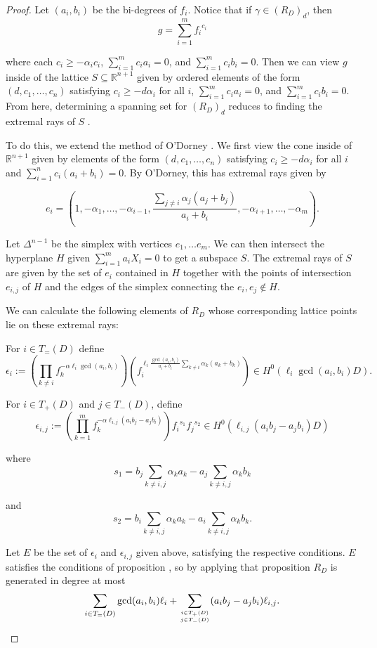 \documentclass{amsart}
\theoremstyle{plain}
\theoremstyle{definition}
\theoremstyle{remark}
\numberwithin{equation}{section}
\newcommand\bida{a}
\newcommand\bidb{b}
\begin{document}
\begin{proof}
Let $(\bida_i, \bidb_i)$ be the bi-degrees of $f_i$. Notice that if $\gamma
\in (R_D)_d$, then 
\[
	g = \sum_{i=1}^m {f_i}^{c_i}
\]

\noindent
where each $c_i \ge - \alpha_i c_i$, $\sum_{i=1}^m c_i \bida_i = 0$,
and $\sum_{i=1}^m c_i \bidb_i = 0$. Then we can view $g$ inside of the
lattice $S \subseteq \mathbb{R}^{n + 1}$ given by ordered elements of
the form $(d, c_1, \ldots, c_n)$ satisfying $c_i \ge - d \alpha_i$
for all $i$, $\sum_{i=1}^m c_i \bida_i = 0$, and $\sum_{i = 1}^m c_i \bidb_i =
 0$. From here, determining a spanning set for $(R_D)_d$ reduces to
finding the extremal rays of $S$ .

To do this, we extend the method of O'Dorney . We first
view the cone inside of $\mathbb{R}^{n+1}$ given by elements of the
form $(d, c_1, \ldots, c_n)$ satisfying $c_i \ge -d \alpha_i$ for
all $i$ and $\sum_{i = 1}^n c_i (\bida_i + \bidb_i) =0$. By O'Dorney, this
has extremal rays given by
 
\[
	e_i = (1, -\alpha_1, \ldots, -\alpha_{i-1}, \frac{\sum_{j \ne i}
	\alpha_j(\bida_j+ \bidb_j)}{\bida_i + \bidb_i}, -\alpha_{i + 1}, \ldots, - \alpha_m).
\]

Let $\Delta^{n-1}$ be the simplex with vertices $e_1, \ldots e_m$.
We can then intersect the hyperplane $H$ given $\sum_{i=1}^m \bida_i X_i
= 0$ to get a subspace $S$. The extremal rays of $S$ are given
by the set of $e_i$ contained in $H$ together with the points of
intersection $e_{i, j}$ of $H$ and the edges of the simplex
connecting the $e_i, e_j \not \in H$.

We can calculate the following elements of $R_D$ whose
corresponding lattice points lie on these extremal rays:

For $i \in T_=(D)$
define
\[
	\epsilon_i := (\prod_{k \ne i} f_k^{-\alpha \ell_i \gcd(\bida_i, \bidb_i)})
	(f_i^{\ell_i \frac{\gcd(\bida_i, \bidb_i)}{\bida_i + \bidb_i}\sum_{k \ne i}
	\alpha_k (\bida_k + \bidb_k)}) \in H^0(\ell_i \gcd(\bida_i, \bidb_i) D).
\]

For $i \in T_+(D)$ and $j \in T_-(D)$, define
\[
	\epsilon_{i, j} := (\prod_{k = 1}^m f_k^{-\alpha \ell_{i,j} (\bida_i \bidb_
j - \bida_j \bidb_i)}) {f_i}^{s_1} {f_j}^{s_2} \in H^0(\ell_{i,j}(\bida_i \bidb_j - 
\bida_j \bidb_i)D)
\]

where
\[
	s_1 = \bidb_j \sum_{k \ne i,j} \alpha_k \bida_k - \bida_j \sum_{k\ne i, j}
	\alpha_k \bidb_k
\]

\noindent
and
\[
	s_2 = \bidb_i \sum_{k \ne i,j} \alpha_k \bida_k - \bida_i \sum_{k \ne i, j}
	\alpha_k \bidb_k.
\]

Let $E$ be the set of $\epsilon_i$ and $\epsilon_{i,j}$ given 
above, satisfying the respective conditions.
$E$ satisfies the conditions of proposition , so by applying that proposition $R_D$ is generated in 
degree at most
\[
	\sum_{i\in T_=(D)} \gcd(\bida_i, \bidb_i)\ell_i + \sum_{i\in T_+(D) \atop
	j \in T_-(D)} (\bida_i \bidb_j- \bida_j \bidb_i)\ell_{i,j}.
\]
\end{proof}
\end{document}
